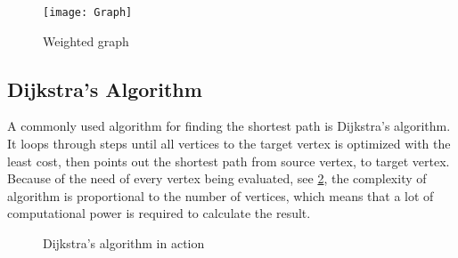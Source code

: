 



  \begin{figure}[ht!]
    \centering
    \texttt{[image: Graph]}
    \caption{Weighted graph}
    \label{fig:graph}
  \end{figure}


  \subsection{Dijkstra's Algorithm}\label{subs_dijkstra}


  A commonly used algorithm for finding the shortest path is Dijkstra's algorithm. It loops through steps until all vertices to the target vertex is optimized with the least cost, then points out the shortest path from source vertex, to target vertex. Because of the need of every vertex being evaluated, see \cref{fig:dijkstra}, the complexity of algorithm is proportional to the number of vertices, which means that a lot of computational power is required to calculate the result. \cite{Dijkstr1959}

  \begin{figure}[ht!]
    \centering
    \caption{Dijkstra's algorithm in action}
    \label{fig:dijkstra}
  \end{figure}

